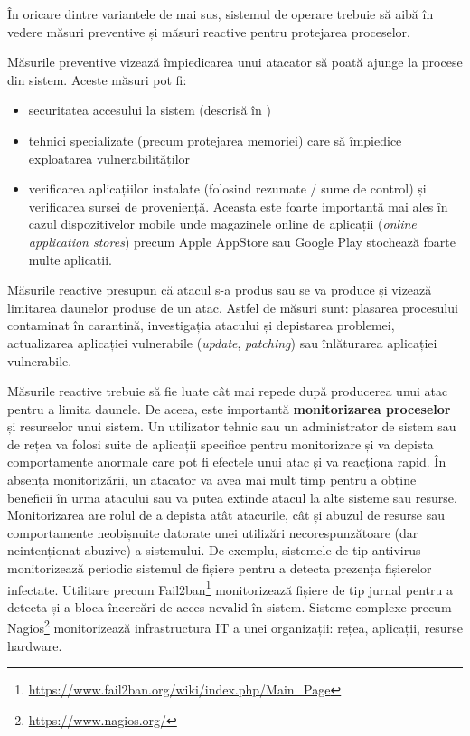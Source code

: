 În oricare dintre variantele de mai sus, sistemul de operare trebuie să aibă în vedere măsuri preventive și măsuri reactive pentru protejarea proceselor.

Măsurile preventive vizează împiedicarea unui atacator să poată ajunge la procese din sistem.
Aceste măsuri pot fi:

\begin{itemize}
  \item securitatea accesului la sistem (descrisă în )
  \item tehnici specializate (precum protejarea memoriei) care să împiedice exploatarea vulnerabilităților
  \item verificarea aplicațiilor instalate (folosind rezumate / sume de control) și verificarea sursei de proveniență.
    Aceasta este foarte importantă mai ales în cazul dispozitivelor mobile unde magazinele online de aplicații (\textit{online application stores}) precum Apple AppStore sau Google Play stochează foarte multe aplicații.
\end{itemize}

Măsurile reactive presupun că atacul s-a produs sau se va produce și vizează limitarea daunelor produse de un atac.
Astfel de măsuri sunt: plasarea procesului contaminat în carantină, investigația atacului și depistarea problemei, actualizarea aplicației vulnerabile (\textit{update}, \textit{patching}) sau înlăturarea aplicației vulnerabile.

Măsurile reactive trebuie să fie luate cât mai repede după producerea unui atac pentru a limita daunele.
De aceea, este importantă \textbf{monitorizarea proceselor} și resurselor unui sistem.
Un utilizator tehnic sau un administrator de sistem sau de rețea va folosi suite de aplicații specifice pentru monitorizare și va depista comportamente anormale care pot fi efectele unui atac și va reacționa rapid.
În absența monitorizării, un atacator va avea mai mult timp pentru a obține beneficii în urma atacului sau va putea extinde atacul la alte sisteme sau resurse.
Monitorizarea are rolul de a depista atât atacurile, cât și abuzul de resurse sau comportamente neobișnuite datorate unei utilizări necorespunzătoare (dar neintenționat abuzive) a sistemului.
De exemplu, sistemele de tip antivirus monitorizează periodic sistemul de fișiere pentru a detecta prezența fișierelor infectate.
Utilitare precum Fail2ban\footnote{\url{https://www.fail2ban.org/wiki/index.php/Main\_Page}} monitorizează fișiere de tip jurnal pentru a detecta și a bloca încercări de acces nevalid în sistem.
Sisteme complexe precum Nagios\footnote{\url{https://www.nagios.org/}} monitorizează infrastructura IT a unei organizații: rețea, aplicații, resurse hardware.

